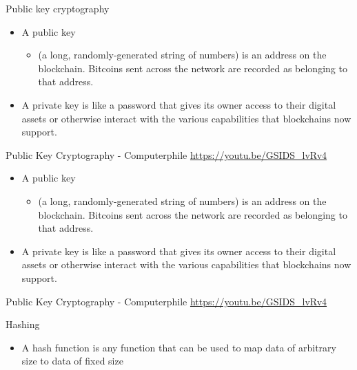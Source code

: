 \documentclass[presentation]{beamer}
\begin{document}
\begin{frame}[label=sec-2-5]{Public key cryptography}
\begin{itemize}
\item A \alert{public key}
\begin{itemize}
\item (a long, randomly-generated string of numbers) is an address on the blockchain. Bitcoins sent across the network are recorded as belonging to that address.
\end{itemize}
\item A \alert{private key} is like a password that gives its owner access to their digital assets or otherwise interact with the various capabilities that blockchains now support.
\end{itemize}

\begin{alertblock}{Public Key Cryptography - Computerphile}
\url{https://youtu.be/GSIDS_lvRv4}


\begin{itemize}
\item A \alert{public key}
\begin{itemize}
\item (a long, randomly-generated string of numbers) is an address on the blockchain. Bitcoins sent across the network are recorded as belonging to that address.
\end{itemize}
\item A \alert{private key} is like a password that gives its owner access to their digital assets or otherwise interact with the various capabilities that blockchains now support.
\end{itemize}
\end{alertblock}

\begin{alertblock}{Public Key Cryptography - Computerphile}
\url{https://youtu.be/GSIDS_lvRv4}
\end{alertblock}
\end{frame}

\begin{frame}[label=sec-2-6]{Hashing}
\begin{itemize}
\item A \alert{hash function} is any function that can be used to map data of arbitrary size to data of fixed size
\end{itemize}
\end{frame}
\end{document}
